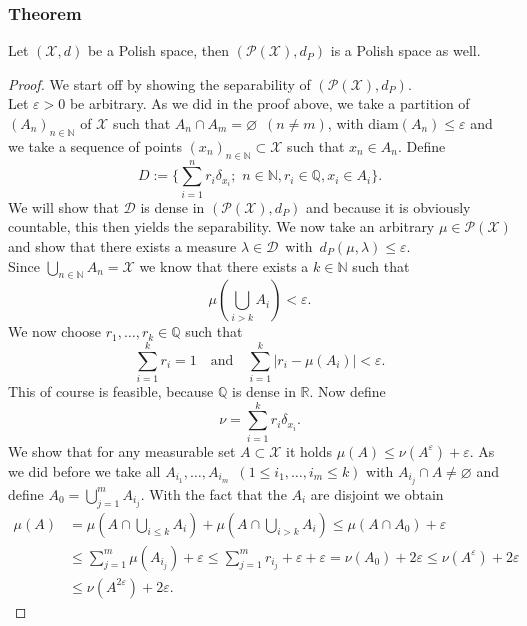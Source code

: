 \documentclass[11pt,a4paper]{article}
\begin{document}
\subsubsection{Theorem}
Let $(\mathcal{X},d)$ be a Polish space, then $(\mathcal{P(X)},d_P)$ is a Polish space as well.
\begin{proof}
We start off by showing the separability of $(\mathcal{P(X)},d_P)$.\vspace{1em}\\
Let $\varepsilon>0$ be arbitrary. As we did in the proof above, we take a partition of $(A_n)_{n\in\mathbb{N}}$ of $\mathcal{X}$ such that $A_n\cap{}A_m=\varnothing\,\,\,(n\neq{}m)$, with $\text{diam}(A_n)\leq\varepsilon$ and we take a sequence of points $(x_n)_{n\in\mathbb{N}}\subset\mathcal{X}$ such that $x_n\in{}A_n$.
Define
\[
D:=\Big\lbrace\sum\limits_{i=1}^{n}r_i\delta_{x_i};\,\,n\in\mathbb{N},r_i\in\mathbb{Q},x_i\in{}A_i\Big\rbrace.
\] 
We will show that $\mathcal{D}$ is dense in $(\mathcal{P(X)},d_P)$ and because it is obviously countable, this then yields the separability. We now take an arbitrary $\mu\in\mathcal{P(X)}$ and show that there exists a measure $\lambda\in\mathcal{D}\,$ with $\,d_P(\mu,\lambda)\leq\varepsilon$. \vspace{1em}\\Since $\bigcup_{n\in\mathbb{N}}A_n=\mathcal{X}$ we know that there exists a $k\in\mathbb{N}$ such that 
\[
\mu\left(\bigcup\limits_{i>k}A_i\right)<\varepsilon.
\]
We now choose $r_1,\ldots,r_k\in\mathbb{Q}$ such that 
\[
\sum\limits_{i=1}^{k}r_i=1\quad\text{and}\quad\sum\limits_{i=1}^{k}|r_i - \mu(A_i)|<\varepsilon.
\]
This of course is feasible, because $\mathbb{Q}$ is dense in $\mathbb{R}.$ Now define 
\[
\nu=\sum\limits_{i=1}^{k}r_i\delta_{x_i}.
\]
We show that for any measurable set $A\subset\mathcal{X}$ it holds $\mu(A)\leq\nu(A^{\varepsilon})+\varepsilon$. As we did before we take all $A_{i_1},\ldots,A_{i_m}\,\,\,(1\leq{}i_1,\ldots,i_m\leq{}k)$ with $A_{i_j}\cap{}A\neq\varnothing$ and define $A_0=\bigcup\limits_{j=1}^{m}A_{i_j}$. With the fact that the $A_i$ are disjoint we obtain
\begin{align*}
\mu(A)&=\mu(A\cap\bigcup\limits_{i\leq{}k}A_i)+\mu(A\cap\bigcup\limits_{i>k}A_i)\leq\mu(A\cap{}A_0)+\varepsilon \\&\leq \sum\limits_{j=1}^{m}\mu(A_{i_j}) + \varepsilon\leq\sum\limits_{j=1}^{m}r_{i_j}+\varepsilon+\varepsilon=\nu(A_0)+2\varepsilon\leq\nu(A^{\varepsilon})+2\varepsilon \\[5pt]&\leq\nu(A^{2\varepsilon})+2\varepsilon.
\end{align*}

\end{proof}
\end{document}
